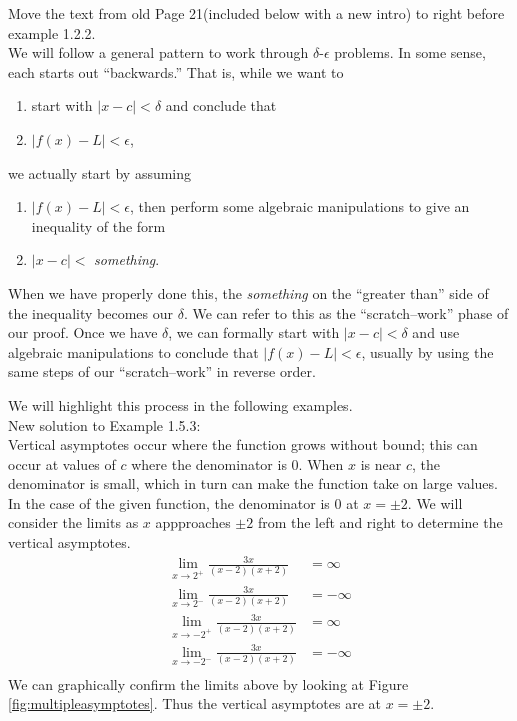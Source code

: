 \documentclass[10pt]{article}
\begin{document}
Move the text from old Page 21(included below with a new intro) to right before example 1.2.2. \\

We will follow a general pattern to work through $\delta$-$\epsilon$ problems. In some sense, each starts out ``backwards.'' That is, while we want to
\begin{enumerate}
	\item start with $|x-c|<\delta$ and conclude that
	\item $|f(x)-L|<\epsilon$,
\end{enumerate}
we actually start by assuming 
\begin{enumerate}
	\item $|f(x)-L|<\epsilon$, then perform some algebraic manipulations to give an inequality of the form
	\item $|x-c|<$ \textit{something}.
\end{enumerate} 
When we have properly done this, the \textit{something} on the ``greater than'' side of the inequality becomes our $\delta$. We can refer to this as the ``scratch--work'' phase of our proof. Once we have $\delta$, we can formally start with $|x-c|<\delta$ and use algebraic manipulations to conclude that $|f(x)-L|<\epsilon$, usually by using the same steps of our ``scratch--work'' in reverse order.

We will highlight this process in the following examples.\\

New solution to Example 1.5.3:  \\

Vertical asymptotes occur where the function grows without bound; this can occur at values of $c$ where the denominator is 0. When $x$ is near $c$, the denominator is small, which in turn can make the function take on large values.  In the case of the given function, the denominator is 0 at $x=\pm 2$.  We will consider the limits as $x$ appproaches $\pm 2$ from the left and right to determine the vertical asymptotes. 
\begin{align*}
\lim_{x\to 2^+} \frac {3x}{(x-2)(x+2)}&=\infty\\
\lim_{x\to 2^-}\frac {3x}{(x-2)(x+2)}&=-\infty\\
\lim_{x\to -2^+} \frac {3x}{(x-2)(x+2)}&=\infty\\
\lim_{x\to -2^-}\frac {3x}{(x-2)(x+2)}&=-\infty\\
\end{align*}
 We can graphically confirm the limits above by looking at Figure \ref{fig:multipleasymptotes}. Thus the vertical asymptotes are at $x=\pm2$.
\end{document}
